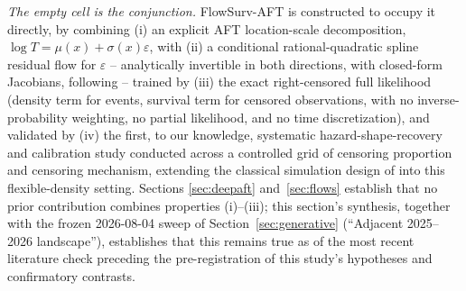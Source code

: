 \documentclass[11pt]{article}
\newcommand{\eps}{\varepsilon}
\begin{document}
\emph{The empty cell is the conjunction.} FlowSurv-AFT is constructed to
occupy it directly, by combining (i) an explicit AFT location-scale
decomposition, $\log T = \mu(x) + \sigma(x)\eps$, with (ii) a conditional
rational-quadratic spline residual flow for $\eps$ -- analytically
invertible in both directions, with closed-form Jacobians, following
\citet{durkan2019nsf} -- trained by (iii) the exact right-censored full
likelihood (density term for events, survival term for censored
observations, with no inverse-probability weighting, no partial
likelihood, and no time discretization), and validated by (iv) the first,
to our knowledge, systematic hazard-shape-recovery and calibration study
conducted across a controlled grid of censoring proportion and censoring
mechanism, extending the classical simulation design of
\citet{opatha2024} into this flexible-density setting. Sections
\ref{sec:deepaft} and~\ref{sec:flows} establish that no prior
contribution combines properties (i)--(iii); this section's synthesis,
together with the frozen 2026-08-04 sweep of Section~\ref{sec:generative}
(``Adjacent 2025--2026 landscape''), establishes that this remains true as
of the most recent literature check preceding the pre-registration of
this study's hypotheses and confirmatory contrasts.



\end{document}
